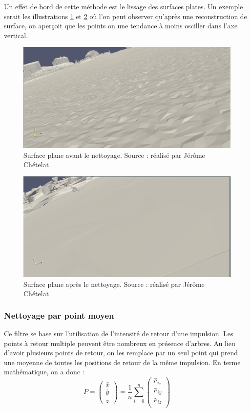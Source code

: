 Un effet de bord de cette méthode est le lissage des surfaces plates. Un exemple serait les illustrations \ref{fig:before_las_filter} et \ref{fig:after_las_filter} où l'on peut observer qu'après une reconstruction de surface, on aperçoit que les points on une tendance à moins osciller dans l'axe vertical.
\begin{figure}[htbp!]
    \centering
    \includegraphics[width=0.8\linewidth]{figures/lissage_brut.png}
    \caption{Surface plane avant le nettoyage. Source : réalisé par Jérôme Chételat}
    \label{fig:before_las_filter}
\end{figure}
\begin{figure}[htbp!]
    \centering
    \includegraphics[width=0.8\linewidth]{figures/lissage_filtrer.png}
    \caption{Surface plane après le nettoyage. Source : réalisé par Jérôme Chételat}
    \label{fig:after_las_filter}
\end{figure}

\subsubsection{Nettoyage par point moyen}

Ce filtre se base sur l'utilisation de l'intensité de retour d'une impulsion. Les points à retour multiple peuvent être nombreux en présence d'arbres. Au lieu d'avoir plusieurs points de retour, on les remplace par un seul point qui prend une moyenne de toutes les positions de retour de la même impulsion. En terme mathématique, on a donc : 
$$
P = 
\begin{pmatrix}
    \bar{x} \\
    \bar{y} \\
    \bar{z}
\end{pmatrix}
=
\frac{1}{n}
\sum_{i=0}^{n}
\begin{pmatrix}
   p_{i_x} \\
   p_{iy} \\
   p_{iz} \\
\end{pmatrix}
$$

